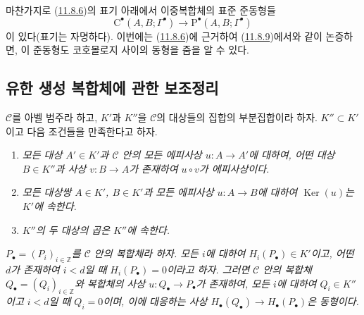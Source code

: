 \begin{env}[11.8.10]
\label{0.11.8.10-fr}
마찬가지로 (\hyperref[0.11.8.6-fr]{11.8.6})의 표기 아래에서 이중복합체의
표준 준동형들
\[
\mathrm C^\bullet(A,B;\Gamma^\bullet)\longrightarrow
\mathrm P^\bullet(A,B;\Gamma^\bullet)
\]
이 있다(표기는 자명하다). 이번에는
(\hyperref[0.11.8.6-fr]{11.8.6})에 근거하여
(\hyperref[0.11.8.9-fr]{11.8.9})에서와 같이 논증하면, 이 준동형도
코호몰로지 사이의 동형을 줌을 알 수 있다.
\end{env}

\subsection{유한 생성 복합체에 관한 보조정리}
\label{subsection:0.11.9-fr}

\begin{proposition}[11.9.1]
\label{0.11.9.1-fr}
$\mathcal C$를 아벨 범주라 하고, $K'$과 $K''$을 $\mathcal C$의 대상들의
집합의 부분집합이라 하자. $K''\subset K'$이고 다음 조건들을 만족한다고
하자.
\begin{enumerate}
\item[{\rm(i)}] \emph{모든 대상 $A'\in K'$과 $\mathcal C$ 안의 모든
에피사상 $u:A\to A'$에 대하여, 어떤 대상 $B\in K''$과 사상
$v:B\to A$가 존재하여 $u\circ v$가 에피사상이다.}
\item[{\rm(ii)}] \emph{모든 대상쌍 $A\in K'$, $B\in K'$과 모든
에피사상 $u:A\to B$에 대하여 $\operatorname{Ker}(u)$는 $K'$에 속한다.}
\item[{\rm(iii)}] \emph{$K''$의 두 대상의 곱은 $K''$에 속한다.}
\end{enumerate}
\emph{$P_\bullet=(P_i)_{i\in\mathbb Z}$를 $\mathcal C$ 안의 복합체라 하자.
모든 $i$에 대하여 $H_i(P_\bullet)\in K'$이고, 어떤 $d$가 존재하여
$i<d$일 때 $H_i(P_\bullet)=0$이라고 하자. 그러면 $\mathcal C$ 안의
복합체 $Q_\bullet=(Q_i)_{i\in\mathbb Z}$와 복합체의 사상
$u:Q_\bullet\to P_\bullet$가 존재하여, 모든 $i$에 대하여 $Q_i\in K''$이고
$i<d$일 때 $Q_i=0$이며, 이에 대응하는 사상
$H_\bullet(Q_\bullet)\to H_\bullet(P_\bullet)$은 동형이다.}
\end{proposition}

